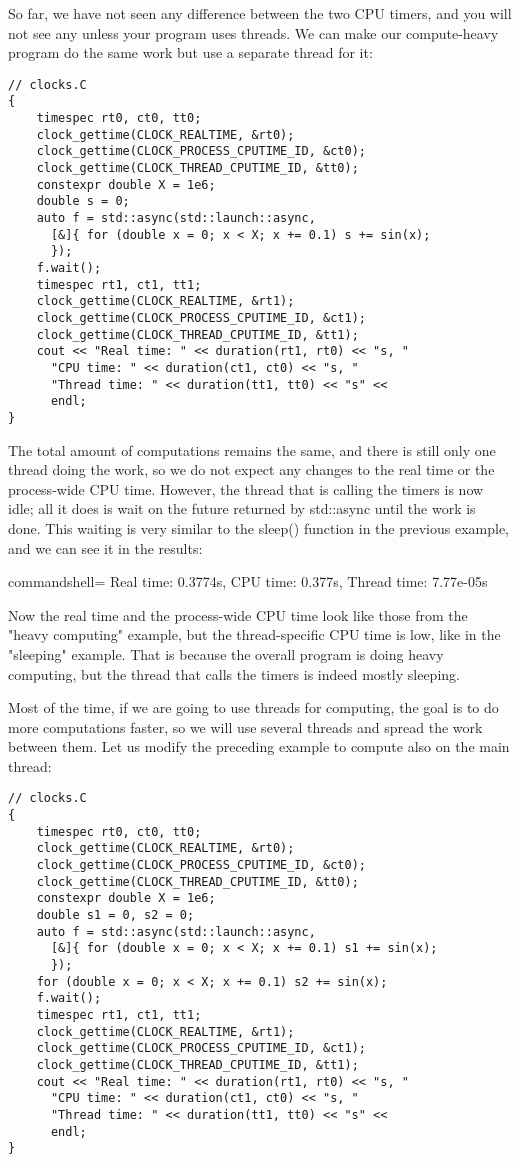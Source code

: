 So far, we have not seen any difference between the two CPU timers, and you will not see any unless your program uses threads. We can make our compute-heavy program do the same work but use a separate thread for it:

\begin{lstlisting}[style=styleCXX]
// clocks.C
{
	timespec rt0, ct0, tt0;
	clock_gettime(CLOCK_REALTIME, &rt0);
	clock_gettime(CLOCK_PROCESS_CPUTIME_ID, &ct0);
	clock_gettime(CLOCK_THREAD_CPUTIME_ID, &tt0);
	constexpr double X = 1e6;
	double s = 0;
	auto f = std::async(std::launch::async,
	  [&]{ for (double x = 0; x < X; x += 0.1) s += sin(x);
	  });
	f.wait();
	timespec rt1, ct1, tt1;
	clock_gettime(CLOCK_REALTIME, &rt1);
	clock_gettime(CLOCK_PROCESS_CPUTIME_ID, &ct1);
	clock_gettime(CLOCK_THREAD_CPUTIME_ID, &tt1);
	cout << "Real time: " << duration(rt1, rt0) << "s, "
	  "CPU time: " << duration(ct1, ct0) << "s, "
	  "Thread time: " << duration(tt1, tt0) << "s" <<
	  endl;
}
\end{lstlisting}

The total amount of computations remains the same, and there is still only one thread doing the work, so we do not expect any changes to the real time or the process-wide CPU time. However, the thread that is calling the timers is now idle; all it does is wait on the future returned by std::async until the work is done. This waiting is very similar to the sleep() function in the previous example, and we can see it in the results:

\begin{tcblisting}{commandshell={}}
Real time: 0.3774s, CPU time: 0.377s, Thread time: 7.77e-05s
\end{tcblisting}

Now the real time and the process-wide CPU time look like those from the "heavy computing" example, but the thread-specific CPU time is low, like in the "sleeping" example. That is because the overall program is doing heavy computing, but the thread that calls the timers is indeed mostly sleeping.

Most of the time, if we are going to use threads for computing, the goal is to do more computations faster, so we will use several threads and spread the work between them. Let us modify the preceding example to compute also on the main thread:

\begin{lstlisting}[style=styleCXX]
// clocks.C
{
	timespec rt0, ct0, tt0;
	clock_gettime(CLOCK_REALTIME, &rt0);
	clock_gettime(CLOCK_PROCESS_CPUTIME_ID, &ct0);
	clock_gettime(CLOCK_THREAD_CPUTIME_ID, &tt0);
	constexpr double X = 1e6;
	double s1 = 0, s2 = 0;
	auto f = std::async(std::launch::async,
	  [&]{ for (double x = 0; x < X; x += 0.1) s1 += sin(x);
	  });
	for (double x = 0; x < X; x += 0.1) s2 += sin(x);
	f.wait();
	timespec rt1, ct1, tt1;
	clock_gettime(CLOCK_REALTIME, &rt1);
	clock_gettime(CLOCK_PROCESS_CPUTIME_ID, &ct1);
	clock_gettime(CLOCK_THREAD_CPUTIME_ID, &tt1);
	cout << "Real time: " << duration(rt1, rt0) << "s, "
	  "CPU time: " << duration(ct1, ct0) << "s, "
	  "Thread time: " << duration(tt1, tt0) << "s" <<
	  endl;
}
\end{lstlisting}

